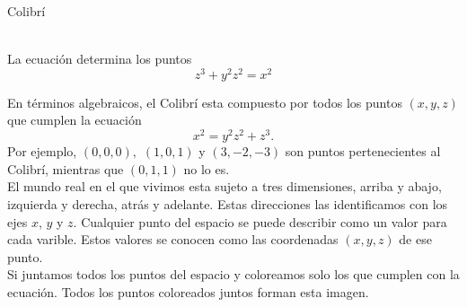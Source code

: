 \documentclass[es]{../../common/SurferDesc}%
\begin{document}
\footnotesize

\begin{surferPage}
  \begin{surferTitle}Colibrí\end{surferTitle}   \\
La ecuación determina los puntos\\
  
  \smallskip
\[z^3+ y^2	z^2	= x^2\]

\singlespacing
En términos algebraicos, el Colibrí esta compuesto por todos los puntos $(x, y, z)$ que cumplen la ecuación
\smallskip
\[ x^2= y^2z^2+z^3.\]
\smallskip
Por ejemplo, $(0,0,0),$ $(1,0,1)$ y $(3,-2,-3)$ son puntos pertenecientes al Colibrí, mientras que $(0,1,1)$ no lo es.\\
 \singlespacing
El mundo real en el que vivimos esta sujeto a tres dimensiones, arriba y abajo, izquierda y derecha, atrás y adelante. Estas direcciones las identificamos con los ejes $x$, $y$ y $z$. Cualquier punto del espacio se puede describir como un valor para cada varible. Estos valores se conocen como las coordenadas $(x,y,z)$ de ese punto.\\
\singlespacing
Si juntamos todos los puntos del espacio y coloreamos solo los que cumplen con la ecuación. Todos los puntos coloreados juntos forman esta imagen.\\
\singlespacing


  \begin{surferText}
     \end{surferText}
\end{surferPage}
\end{document}
